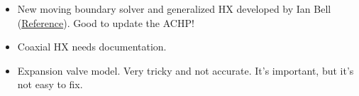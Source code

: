 \documentclass[]{article}
\begin{document}
\begin{itemize}
\item New moving boundary solver and generalized HX developed by Ian Bell (\href{https://www.researchgate.net/publication/272200288_A_generalized_moving-boundary_algorithm_to_predict_the_heat_transfer_rate_of_counterflow_heat_exchangers_for_any_phase_configuration}{Reference}). Good to update the ACHP!
\item Coaxial HX needs documentation.
\item Expansion valve model. Very tricky and not accurate. It's important, but it's not easy to fix.
\end{itemize}
\end{document}
